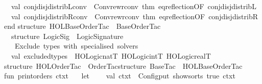 \begin{isabellebody}
\ \ val\ conj{\isacharunderscore}{\kern0pt}disj{\isacharunderscore}{\kern0pt}distribL{\isacharunderscore}{\kern0pt}conv\ {\isacharequal}{\kern0pt}\ Conv{\isachardot}{\kern0pt}rewr{\isacharunderscore}{\kern0pt}conv\ {\isacharat}{\kern0pt}{\isacharbraceleft}{\kern0pt}thm\ eq{\isacharunderscore}{\kern0pt}reflection{\isacharbrackleft}{\kern0pt}OF\ conj{\isacharunderscore}{\kern0pt}disj{\isacharunderscore}{\kern0pt}distribL{\isacharbrackright}{\kern0pt}{\isacharbraceright}{\kern0pt}\isanewline
\ \ val\ conj{\isacharunderscore}{\kern0pt}disj{\isacharunderscore}{\kern0pt}distribR{\isacharunderscore}{\kern0pt}conv\ {\isacharequal}{\kern0pt}\ Conv{\isachardot}{\kern0pt}rewr{\isacharunderscore}{\kern0pt}conv\ {\isacharat}{\kern0pt}{\isacharbraceleft}{\kern0pt}thm\ eq{\isacharunderscore}{\kern0pt}reflection{\isacharbrackleft}{\kern0pt}OF\ conj{\isacharunderscore}{\kern0pt}disj{\isacharunderscore}{\kern0pt}distribR{\isacharbrackright}{\kern0pt}{\isacharbraceright}{\kern0pt}\isanewline
end\isanewline
\isanewline
structure\ HOL{\isacharunderscore}{\kern0pt}Base{\isacharunderscore}{\kern0pt}Order{\isacharunderscore}{\kern0pt}Tac\ {\isacharequal}{\kern0pt}\ Base{\isacharunderscore}{\kern0pt}Order{\isacharunderscore}{\kern0pt}Tac{\isacharparenleft}{\kern0pt}\isanewline
\ \ structure\ Logic{\isacharunderscore}{\kern0pt}Sig\ {\isacharequal}{\kern0pt}\ Logic{\isacharunderscore}{\kern0pt}Signature{\isacharsemicolon}{\kern0pt}\isanewline
\ \ {\isacharparenleft}{\kern0pt}{\isacharasterisk}{\kern0pt}\ Exclude\ types\ with\ specialised\ solvers{\isachardot}{\kern0pt}\ {\isacharasterisk}{\kern0pt}{\isacharparenright}{\kern0pt}\isanewline
\ \ val\ excluded{\isacharunderscore}{\kern0pt}types\ {\isacharequal}{\kern0pt}\ {\isacharbrackleft}{\kern0pt}HOLogic{\isachardot}{\kern0pt}natT{\isacharcomma}{\kern0pt}\ HOLogic{\isachardot}{\kern0pt}intT{\isacharcomma}{\kern0pt}\ HOLogic{\isachardot}{\kern0pt}realT{\isacharbrackright}{\kern0pt}\isanewline
{\isacharparenright}{\kern0pt}\isanewline
\isanewline
structure\ HOL{\isacharunderscore}{\kern0pt}Order{\isacharunderscore}{\kern0pt}Tac\ {\isacharequal}{\kern0pt}\ Order{\isacharunderscore}{\kern0pt}Tac{\isacharparenleft}{\kern0pt}structure\ Base{\isacharunderscore}{\kern0pt}Tac\ {\isacharequal}{\kern0pt}\ HOL{\isacharunderscore}{\kern0pt}Base{\isacharunderscore}{\kern0pt}Order{\isacharunderscore}{\kern0pt}Tac{\isacharparenright}{\kern0pt}\isanewline
\isanewline
fun\ print{\isacharunderscore}{\kern0pt}orders\ ctxt{}\ {\isacharequal}{\kern0pt}\isanewline
\ \ let\isanewline
\ \ \ \ val\ ctxt\ {\isacharequal}{\kern0pt}\ Config{\isachardot}{\kern0pt}put\ show{\isacharunderscore}{\kern0pt}sorts\ true\ ctxt{}\isanewline

\end{isabellebody}
